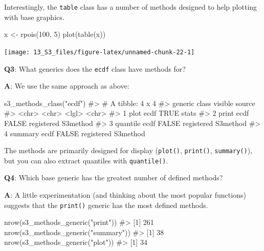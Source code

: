 \documentclass[
]{krantz}
\makeatletter
\newenvironment{Shaded}{\begin{snugshade}}{\end{snugshade}}
\newcommand{\CommentTok}[1]{\textcolor[rgb]{0.56,0.35,0.01}{\textit{#1}}}
\newcommand{\DecValTok}[1]{\textcolor[rgb]{0.00,0.00,0.81}{#1}}
\newcommand{\KeywordTok}[1]{\textcolor[rgb]{0.13,0.29,0.53}{\textbf{#1}}}
\newcommand{\NormalTok}[1]{#1}
\newcommand{\StringTok}[1]{\textcolor[rgb]{0.31,0.60,0.02}{#1}}
\newenvironment{kframe}{%
\medskip{}
\setlength{\fboxsep}{.8em}
 \def\at@end@of@kframe{}%
 \ifinner\ifhmode%
  \def\at@end@of@kframe{\end{minipage}}%
  \begin{minipage}{\columnwidth}%
 \fi\fi%
 \def\FrameCommand##1{\hskip\@totalleftmargin \hskip-\fboxsep
 \colorbox{shadecolor}{##1}\hskip-\fboxsep
     \hskip-\linewidth \hskip-\@totalleftmargin \hskip\columnwidth}%
 \MakeFramed {\advance\hsize-\width
   \@totalleftmargin\z@ \linewidth\hsize
   \@setminipage}}%
 {\par\unskip\endMakeFramed%
 \at@end@of@kframe}
\renewenvironment{Shaded}{\begin{kframe}}{\end{kframe}}
\renewcommand{\KeywordTok} [1]{\textcolor[rgb]{0.00,0.44,0.13}{{#1}}}
\renewcommand{\DecValTok}  [1]{\textcolor[rgb]{0.25,0.63,0.44}{{#1}}}
\renewcommand{\StringTok}  [1]{\textcolor[rgb]{0.25,0.44,0.63}{{#1}}}
\renewcommand{\CommentTok} [1]{\textcolor[rgb]{0.38,0.63,0.69}{{#1}}}
\renewcommand{\NormalTok}  [1]{{#1}}
\makeatother
\begin{document}
Interestingly, the \texttt{table} class has a number of methods designed to help plotting with base graphics.

\begin{Shaded}
\begin{Highlighting}[]
\NormalTok{x <-}\StringTok{ }\KeywordTok{rpois}\NormalTok{(}\DecValTok{100}\NormalTok{, }\DecValTok{5}\NormalTok{)}
\KeywordTok{plot}\NormalTok{(}\KeywordTok{table}\NormalTok{(x))}
\end{Highlighting}
\end{Shaded}

\begin{center}\texttt{[image: 13\_S3\_files/figure-latex/unnamed-chunk-22-1]} \end{center}

\textbf{{Q3}}: What generics does the \texttt{ecdf} class have methods for?

\textbf{{A}}: We use the same approach as above:

\begin{Shaded}
\begin{Highlighting}[]
\KeywordTok{s3_methods_class}\NormalTok{(}\StringTok{"ecdf"}\NormalTok{)}
\CommentTok{#> # A tibble: 4 x 4}
\CommentTok{#>   generic  class visible source             }
\CommentTok{#>   <chr>    <chr> <lgl>   <chr>              }
\CommentTok{#> 1 plot     ecdf  TRUE    stats              }
\CommentTok{#> 2 print    ecdf  FALSE   registered S3method}
\CommentTok{#> 3 quantile ecdf  FALSE   registered S3method}
\CommentTok{#> 4 summary  ecdf  FALSE   registered S3method}
\end{Highlighting}
\end{Shaded}

The methods are primarily designed for display (\texttt{plot()}, \texttt{print()}, \texttt{summary()}), but you can also extract quantiles with \texttt{quantile()}.

\textbf{{Q4}}: Which base generic has the greatest number of defined methods?

\textbf{{A}}: A little experimentation (and thinking about the most popular functions) suggests that the \texttt{print()} generic has the most defined methods.

\begin{Shaded}
\begin{Highlighting}[]
\KeywordTok{nrow}\NormalTok{(}\KeywordTok{s3_methods_generic}\NormalTok{(}\StringTok{"print"}\NormalTok{))}
\CommentTok{#> [1] 261}
\KeywordTok{nrow}\NormalTok{(}\KeywordTok{s3_methods_generic}\NormalTok{(}\StringTok{"summary"}\NormalTok{))}
\CommentTok{#> [1] 38}
\KeywordTok{nrow}\NormalTok{(}\KeywordTok{s3_methods_generic}\NormalTok{(}\StringTok{"plot"}\NormalTok{))}
\CommentTok{#> [1] 34}
\end{Highlighting}
\end{Shaded}
\end{document}
